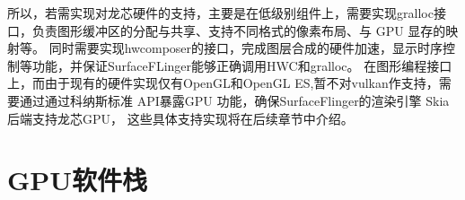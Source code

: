 所以，若需实现对龙芯硬件的支持，主要是在低级别组件上，需要实现gralloc接口，负责图形缓冲区的分配与共享、支持不同格式的像素布局、与 GPU 显存的映射等。
同时需要实现hwcomposer的接口，完成图层合成的硬件加速，显示时序控制等功能，并保证SurfaceFLinger能够正确调用HWC和gralloc。
在图形编程接口上，而由于现有的硬件实现仅有OpenGL和OpenGL ES,暂不对vulkan作支持，需要通过通过科纳斯标准 API暴露GPU 功能，确保SurfaceFlinger的渲染引擎 Skia后端支持龙芯GPU，
这些具体支持实现将在后续章节中介绍。


\section{GPU软件栈}
